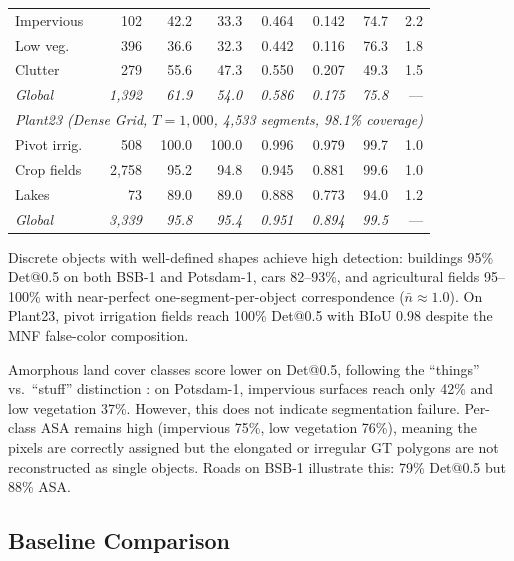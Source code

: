 \documentclass[review,11pt,authoryear]{elsarticle}
\begin{document}
\begin{table}[htbp]
\begin{tabular*}{\textwidth}{@{\extracolsep{\fill}}lrrrrrrr}
Impervious  &     102 & 42.2 & 33.3 & 0.464 & 0.142 & 74.7 & 2.2 \\
Low veg.    &     396 & 36.6 & 32.3 & 0.442 & 0.116 & 76.3 & 1.8 \\
Clutter     &     279 & 55.6 & 47.3 & 0.550 & 0.207 & 49.3 & 1.5 \\
\textit{Global} & \textit{1{,}392} & \textit{61.9} & \textit{54.0} & \textit{0.586} & \textit{0.175} & \textit{75.8} & --- \\
\midrule
\multicolumn{8}{c}{\footnotesize\textit{Plant23 (Dense Grid, $T = 1{,}000$, 4{,}533 segments, 98.1\% coverage)}} \\
\midrule
Pivot irrig. &    508 & 100.0 & 100.0 & 0.996 & 0.979 & 99.7 & 1.0 \\
Crop fields & 2{,}758 & 95.2 & 94.8 & 0.945 & 0.881 & 99.6 & 1.0 \\
Lakes       &      73 & 89.0 & 89.0 & 0.888 & 0.773 & 94.0 & 1.2 \\
\textit{Global} & \textit{3{,}339} & \textit{95.8} & \textit{95.4} & \textit{0.951} & \textit{0.894} & \textit{99.5} & --- \\
\bottomrule
\end{tabular*}
\end{table}

Discrete objects with well-defined shapes achieve high detection: buildings 95\% Det@0.5 on both BSB-1 and Potsdam-1, cars 82--93\%, and agricultural fields 95--100\% with near-perfect one-segment-per-object correspondence ($\bar{n} \approx 1.0$). On Plant23, pivot irrigation fields reach 100\% Det@0.5 with BIoU 0.98 despite the MNF false-color composition.

Amorphous land cover classes score lower on Det@0.5, following the ``things'' vs.\ ``stuff'' distinction \citep{kirillov2019panoptic}: on Potsdam-1, impervious surfaces reach only 42\% and low vegetation 37\%. However, this does not indicate segmentation failure. Per-class ASA remains high (impervious 75\%, low vegetation 76\%), meaning the pixels are correctly assigned but the elongated or irregular GT polygons are not reconstructed as single objects. Roads on BSB-1 illustrate this: 79\% Det@0.5 but 88\% ASA.

\FloatBarrier
\subsection{Baseline Comparison}
\label{sec:res_baselines}
\end{document}
